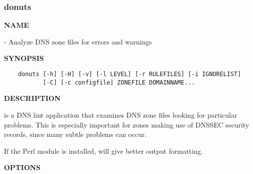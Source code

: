 \clearpage

\subsubsection{donuts}

{\bf NAME}

 - Analyze DNS zone files for errors and warnings

{\bf SYNOPSIS}

\begin{verbatim}
    donuts [-h] [-H] [-v] [-l LEVEL] [-r RULEFILES] [-i IGNORELIST]
           [-C] [-c configfile] ZONEFILE DOMAINNAME...
\end{verbatim}

{\bf DESCRIPTION}

 is a DNS lint application that examines DNS zone files looking
for particular problems.  This is especially important for zones making use of
DNSSEC security records, since many subtle problems can occur.

If the  Perl module is installed,  will give
better output formatting.

{\bf OPTIONS}

